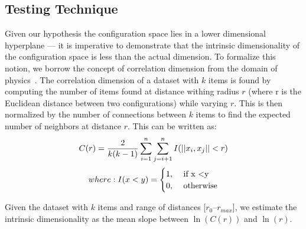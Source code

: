 \documentclass[smallextended]{svjour3}       %
\begin{document}
\subsection{Testing Technique}
Given our hypothesis the configuration space lies in a lower dimensional hyperplane ---  it is imperative to demonstrate that the intrinsic dimensionality of the configuration space is less than the actual dimension. To formalize this notion, we borrow the concept of correlation dimension from the domain of physics~\cite{grassberger2004measuring}. The correlation dimension of a dataset with $k$ items is found by computing the number of items found at distance withing radius $r$ (where r is the Euclidean distance between two configurations) while varying $r$. This is then normalized by the number of connections between $k$ items to find the expected number of neighbors at distance $r$. This can be written as:
\begin{equation}
    C(r) = \frac{2}{k(k-1)} \displaystyle\sum_{i=1}^{n} \displaystyle\sum_{j=i+1}^{n} I(||x_i, x_j|| < r) \\  
 \end{equation} 
$$
where:
    I(x < y) = \begin{cases}
            1, & \text{ if x \textless y}\\
            0, & \text{ otherwise}\\
    \end{cases}
$$
  

Given the dataset with $k$ items and range of distances [$r_0$--$r_{max}$], we estimate the intrinsic dimensionality as the mean slope between $\ln(C(r))$ and $\ln(r)$.
\end{document}
